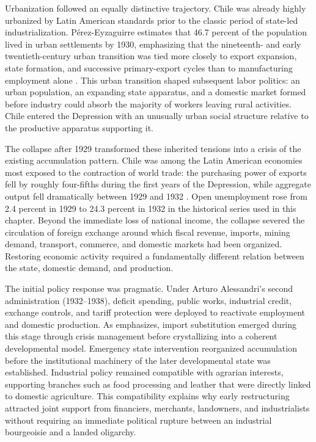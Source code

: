 Urbanization followed an equally distinctive trajectory. Chile was already highly urbanized by Latin American standards prior to the classic period of state-led industrialization. P\'erez-Eyzaguirre estimates that 46.7 percent of the population lived in urban settlements by 1930, emphasizing that the nineteenth- and early twentieth-century urban transition was tied more closely to export expansion, state formation, and successive primary-export cycles than to manufacturing employment alone \citep{PerezEyzaguirre2017}. This urban transition shaped subsequent labor politics: an urban population, an expanding state apparatus, and a domestic market formed before industry could absorb the majority of workers leaving rural activities. Chile entered the Depression with an unusually urban social structure relative to the productive apparatus supporting it.

The collapse after 1929 transformed these inherited tensions into a crisis of the existing accumulation pattern. Chile was among the Latin American economies most exposed to the contraction of world trade: the purchasing power of exports fell by roughly four-fifths during the first years of the Depression, while aggregate output fell dramatically between 1929 and 1932 \citep{BertolaOcampo2021,BulmerThomas2010}. Open unemployment rose from 2.4 percent in 1929 to 24.3 percent in 1932 in the historical series used in this chapter. Beyond the immediate loss of national income, the collapse severed the circulation of foreign exchange around which fiscal revenue, imports, mining demand, transport, commerce, and domestic markets had been organized. Restoring economic activity required a fundamentally different relation between the state, domestic demand, and production.

The initial policy response was pragmatic. Under Arturo Alessandri's second administration (1932--1938), deficit spending, public works, industrial credit, exchange controls, and tariff protection were deployed to reactivate employment and domestic production. As \citet{Silva2007} emphasizes, import substitution emerged during this stage through crisis management before crystallizing into a coherent developmental model. Emergency state intervention reorganized accumulation before the institutional machinery of the later developmental state was established. Industrial policy remained compatible with agrarian interests, supporting branches such as food processing and leather that were directly linked to domestic agriculture. This compatibility explains why early restructuring attracted joint support from financiers, merchants, landowners, and industrialists without requiring an immediate political rupture between an industrial bourgeoisie and a landed oligarchy.


